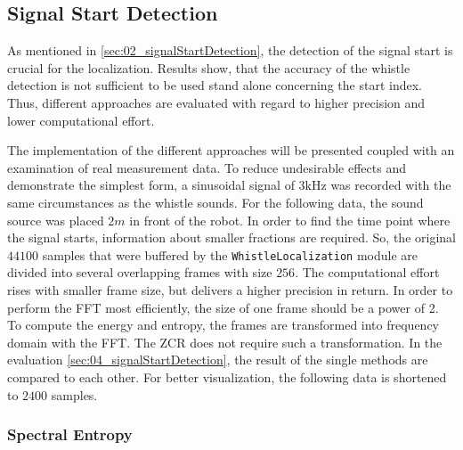 \subsection{Signal Start Detection}
\label{subsec:03_signalStartDetection}

As mentioned in \cref{sec:02_signalStartDetection}, the detection of the
signal start is crucial for the localization.
Results  show, that the accuracy of the whistle detection is not
sufficient to be used stand alone concerning the start index.
Thus, different approaches are evaluated with regard to higher
precision and lower computational effort.

The implementation of the different approaches will be presented coupled with
an examination of real measurement data.
To reduce undesirable effects and demonstrate the simplest form, a sinusoidal
signal of $3\si{\kilo\hertz}$ was recorded with the same circumstances as the
whistle sounds.
For the following data, the sound source was placed $2\si{m}$ in front of the robot.
In order to find the time point where the signal starts, information about
smaller fractions are required.
So, the original $44100$ samples that were buffered by the
\lstinline!WhistleLocalization! module are divided into several overlapping
frames with size $256$. The computational effort rises with smaller frame size,
but delivers a higher precision in return.
In order to perform the \ac{FFT} most efficiently, the size of one frame
should be a power of 2.
To compute the energy and entropy, the frames are transformed into
frequency domain with the \ac{FFT}.
The \ac{ZCR} does not require such a transformation.
In the evaluation \cref{sec:04_signalStartDetection}, the result of the single
methods are compared to each other.
For better visualization, the following data is shortened to $2400$ samples.


\subsubsection*{Spectral Entropy}

